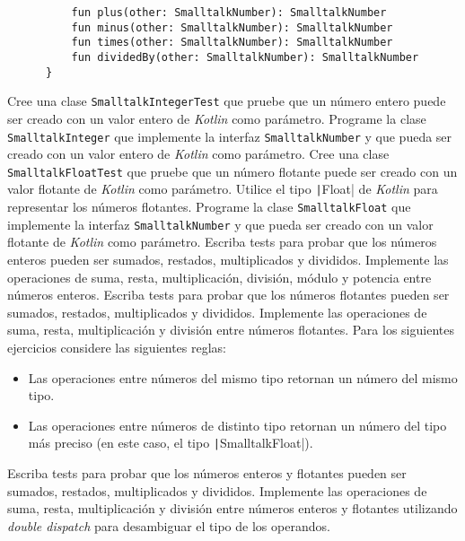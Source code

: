 \begin{Exercise}
\begin{verbatim}
          fun plus(other: SmalltalkNumber): SmalltalkNumber
          fun minus(other: SmalltalkNumber): SmalltalkNumber
          fun times(other: SmalltalkNumber): SmalltalkNumber
          fun dividedBy(other: SmalltalkNumber): SmalltalkNumber
      }
      \end{verbatim}
    \Question Cree una clase \texttt{SmalltalkIntegerTest} que pruebe que un número entero puede ser 
      creado con un valor entero de \textit{Kotlin} como parámetro.
    \Question Programe la clase \texttt{SmalltalkInteger} que implemente la interfaz 
      \texttt{SmalltalkNumber} y que pueda ser creado con un valor entero de \textit{Kotlin} como 
      parámetro.
    \Question Cree una clase \texttt{SmalltalkFloatTest} que pruebe que un número flotante puede ser
      creado con un valor flotante de \textit{Kotlin} como parámetro.
      Utilice el tipo \texttt|Float| de \textit{Kotlin} para representar los números
      flotantes.
    \Question Programe la clase \texttt{SmalltalkFloat} que implemente la interfaz 
      \texttt{SmalltalkNumber} y que pueda ser creado con un valor flotante de \textit{Kotlin} como 
      parámetro.
    \Question Escriba tests para probar que los números enteros pueden ser sumados, restados, 
      multiplicados y divididos.
    \Question Implemente las operaciones de suma, resta, multiplicación, división, módulo y potencia
      entre números enteros.
    \Question Escriba tests para probar que los números flotantes pueden ser sumados, restados,
      multiplicados y divididos.
    \Question Implemente las operaciones de suma, resta, multiplicación y división entre números 
      flotantes.
    \ExeText Para los siguientes ejercicios considere las siguientes reglas:
      \begin{itemize}
        \item Las operaciones entre números del mismo tipo retornan un número del mismo tipo.
        \item Las operaciones entre números de distinto tipo retornan un número del tipo más 
          preciso (en este caso, el tipo \texttt|SmalltalkFloat|).
      \end{itemize}
    \Question Escriba tests para probar que los números enteros y flotantes pueden ser sumados,
      restados, multiplicados y divididos.
    \Question Implemente las operaciones de suma, resta, multiplicación y división entre números
      enteros y flotantes utilizando \textit{double dispatch} para desambiguar el tipo de los
      operandos.
  \end{Exercise}